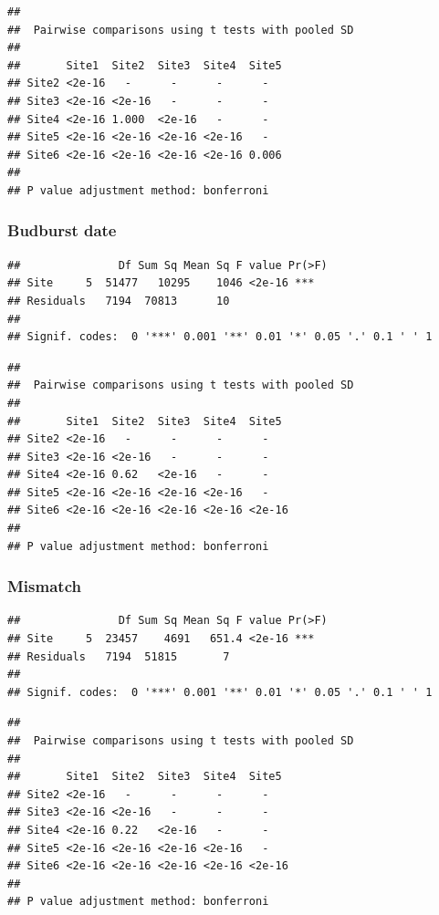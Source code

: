 \documentclass[12 pt]{article}
\begin{document}
\begin{verbatim}
## 
##  Pairwise comparisons using t tests with pooled SD 
##  
##       Site1  Site2  Site3  Site4  Site5
## Site2 <2e-16   -      -      -      -    
## Site3 <2e-16 <2e-16   -      -      -    
## Site4 <2e-16 1.000  <2e-16   -      -    
## Site5 <2e-16 <2e-16 <2e-16 <2e-16   -    
## Site6 <2e-16 <2e-16 <2e-16 <2e-16 0.006
## 
## P value adjustment method: bonferroni
\end{verbatim}

\subsubsection*{Budburst date}

\begin{verbatim}
##               Df Sum Sq Mean Sq F value Pr(>F)    
## Site     5  51477   10295    1046 <2e-16 ***
## Residuals   7194  70813      10                   
## 
## Signif. codes:  0 '***' 0.001 '**' 0.01 '*' 0.05 '.' 0.1 ' ' 1
\end{verbatim}

\begin{verbatim}
## 
##  Pairwise comparisons using t tests with pooled SD 
## 
##       Site1  Site2  Site3  Site4  Site5 
## Site2 <2e-16   -      -      -      -     
## Site3 <2e-16 <2e-16   -      -      -     
## Site4 <2e-16 0.62   <2e-16   -      -     
## Site5 <2e-16 <2e-16 <2e-16 <2e-16   -     
## Site6 <2e-16 <2e-16 <2e-16 <2e-16 <2e-16
## 
## P value adjustment method: bonferroni
\end{verbatim}

\subsubsection*{Mismatch}

\begin{verbatim}
##               Df Sum Sq Mean Sq F value Pr(>F)    
## Site     5  23457    4691   651.4 <2e-16 ***
## Residuals   7194  51815       7                   
## 
## Signif. codes:  0 '***' 0.001 '**' 0.01 '*' 0.05 '.' 0.1 ' ' 1
\end{verbatim}

\begin{verbatim}
## 
##  Pairwise comparisons using t tests with pooled SD 
## 
##       Site1  Site2  Site3  Site4  Site5 
## Site2 <2e-16   -      -      -      -     
## Site3 <2e-16 <2e-16   -      -      -     
## Site4 <2e-16 0.22   <2e-16   -      -     
## Site5 <2e-16 <2e-16 <2e-16 <2e-16   -     
## Site6 <2e-16 <2e-16 <2e-16 <2e-16 <2e-16
## 
## P value adjustment method: bonferroni
\end{verbatim}
\end{document}
